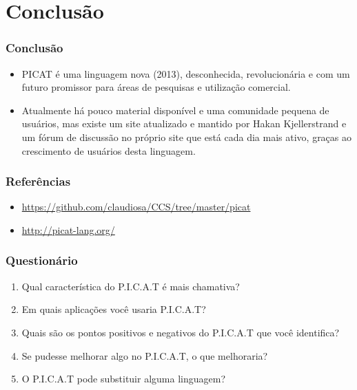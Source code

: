 \documentclass[10pt]{beamer}
\begin{document}

\section{Conclusão}
\begin{frame}
    \frametitle{Conclusão}
    \begin{itemize}
    \item PICAT é uma linguagem nova (2013), desconhecida, revolucionária e com um futuro promissor para áreas de pesquisas e utilização comercial.
    \item Atualmente há pouco material disponível e uma comunidade pequena de usuários, 
    mas existe um site atualizado e mantido por Hakan Kjellerstrand e um fórum de discussão no próprio site que está cada dia mais ativo, 
    graças ao crescimento de usuários desta linguagem.
    \end{itemize}
\end{frame}


\begin{frame}
    \frametitle{Referências}
    \begin{itemize}
     \item \url{https://github.com/claudiosa/CCS/tree/master/picat}
     \item \url{http://picat-lang.org/}
    \end{itemize}
\end{frame}


\begin{frame}
    \frametitle{Questionário}
    \begin{enumerate}
     \item Qual característica do P.I.C.A.T é mais chamativa?
     \item Em quais aplicações você usaria P.I.C.A.T?
     \item Quais são os pontos positivos e negativos do P.I.C.A.T que você identifica?
     \item Se pudesse melhorar algo no P.I.C.A.T, o que melhoraria?
     \item O P.I.C.A.T pode substituir alguma linguagem?
    \end{enumerate}
\end{frame}
\end{document}
